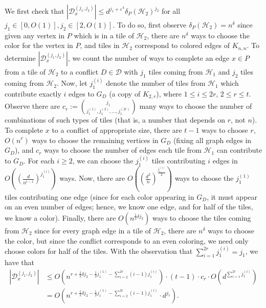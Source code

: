 \documentclass{article}
\theoremstyle{definition}
\newcommand\cH{{\mathcal H}}
\newcommand{\cD}{\mathcal{D}}
\begin{document}
We first check that $\left| \cD_x^{(j_1,j_2)} \right| \leq d^{j_1 + \varepsilon^4} \delta_P(\cH_2)^{j_2}$ for all $j_1 \in [0,O(1)], j_2 \in [2,O(1)]$.  To do so, first observe $\delta_P(\cH_2) = n^\delta$ since given any vertex in $P$ which is in a tile of $\cH_2$, there are $n^\delta$ ways to choose the color for the vertex in $P$, and tiles in $\cH_2$ correspond to colored edges of $K_{n,n}$.  To determine $\left| \cD_x^{(j_1,j_2)} \right|$, we count the number of ways to complete an edge $x \in P$ from a tile of $\cH_2$ to a conflict $D\in \mathcal{D}$ with $j_1$ tiles coming from $\cH_1$ and $j_2$ tiles coming from $\cH_2$.  Now, let $j_1^{(i)}$ denote the number of tiles from $\cH_1$ which contribute exactly $i$ edges to $G_D$ (a copy of $K_{2,r}$), where $1 \leq i \leq 2r$, $2 \leq r \leq t$.  Observe there are $\displaystyle c_r := \binom{j_1}{j_1^{(1)}, j_1^{(2)}, \dots, j_1^{(2r)}}$ many ways to choose the number of combinations of such types of tiles (that is, a number that depends on $r$, not $n$).  To complete $x$ to a conflict of appropriate size, there are $t-1$ ways to choose $r$, $O(n^r)$ ways to choose the remaining vertices in $G_D$ (fixing all graph edges in $G_D$), and $c_r$ ways to choose the number of edges each tile from $\cH_1$ can contribute to $G_D$.  For each $i \geq 2$, we can choose the $j_1^{(i)}$ tiles contributing $i$ edges in $O\left( \left(\frac{d}{n^{i-1}} \right)^{j_1^{(i)}} \right)$ ways. Now, there are $O\left( \left(\frac{d^2}{n} \right)^\frac{j_1^{(1)}}{2} \right)$ ways to choose the $j_1^{(1)}$ tiles contributing one edge (since for each color appearing in $G_D$, it must appear on an even number of edges; hence, we know one edge, and for half of the tiles, we know a color). Finally, there are $O(n^{\frac{1}{2} \delta j_2})$ ways to choose the tiles coming from $\cH_2$ since for every graph edge in a tile of $\cH_2$, there are $n^\delta$ ways to choose the color, but since the conflict corresponds to an even coloring, we need only choose colors for half of the tiles.  With the observation that $\displaystyle \sum_{i=1}^{2r} j_1^{(i)} = j_1$, we have that 
\begin{align*}
    \left| \cD_x^{(j_1,j_2)} \right| &\leq O \left(n^{r + \frac{1}{2} \delta j_2 - \frac{1}{2} j_1^{(1)} - \sum_{i=2}^{2r} (i-1) j_1^{(i)}} \right) \cdot (t-1) \cdot c_r \cdot O \left(d^{\sum_{i=1}^{2r}j_1^{(i)}} \right)\\
    &= O \left(n^{r + \frac{1}{2} \delta j_2 - \frac{1}{2} j_1^{(1)} - \sum_{i=2}^{2r} (i-1) j_1^{(i)}} \cdot d^{j_1} \right).    
\end{align*}
\end{document}
